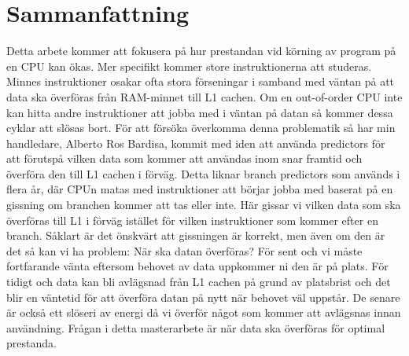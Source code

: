 \chapter*{Sammanfattning}
Detta arbete kommer att fokusera på hur prestandan vid körning av program på en
CPU kan ökas. Mer specifikt kommer store instruktionerna att studeras. Minnes
instruktioner osakar ofta stora förseningar i samband med väntan på att data ska
överföras från RAM-minnet till L1 cachen. Om en out-of-order CPU inte kan hitta
andre instruktioner att jobba med i väntan på datan så kommer dessa cyklar att
slösas bort. För att försöka överkomma denna problematik så har min handledare,
Alberto Ros Bardisa, kommit med iden att använda predictors för att förutspå vilken
data som kommer att användas inom snar framtid och överföra den till L1 cachen i
förväg. Detta liknar branch predictors som används i flera år, där CPUn matas med
instruktioner att börjar jobba med baserat på en gissning om branchen kommer att tas
eller inte. Här gissar vi vilken data som ska överföras till L1 i förväg istället för vilken
instruktioner som kommer efter en branch. Såklart är det önskvärt att gissningen är
korrekt, men även om den är det så kan vi ha problem: När ska datan överföras? För
sent och vi måste fortfarande vänta eftersom behovet av data uppkommer ni den är
på plats. För tidigt och data kan bli avlägsnad från L1 cachen på grund av platsbrist
och det blir en väntetid för att överföra datan på nytt när behovet väl uppstår. De
senare är också ett slöseri av energi då vi överför något som kommer att avlägsnas
innan användning. Frågan i detta masterarbete är när data ska överföras för optimal
prestanda.
\newpage